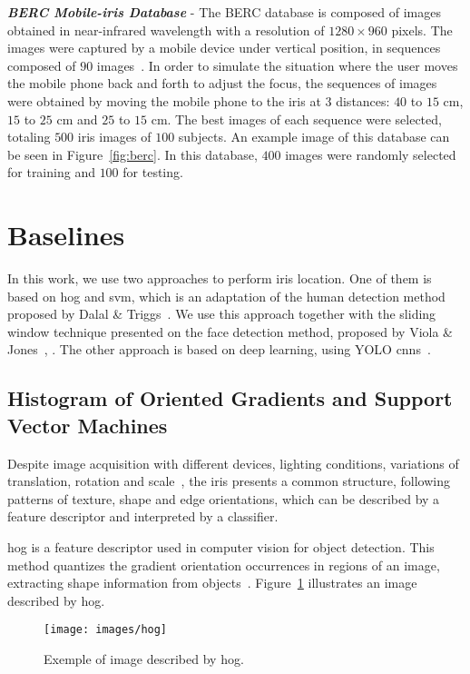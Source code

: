 \documentclass[conference]{IEEEtran}
\begin{document}
\textit{\textbf{BERC Mobile-iris Database}} - The BERC database is composed of images obtained in near-infrared wavelength with a resolution of $1280\times960$ pixels. 
The images were captured by a mobile device under vertical position, in sequences composed of $90$ images~\cite{kim2016empirical}.
In order to simulate the situation where the user moves the mobile phone back and forth to adjust the focus, the sequences of images were obtained by moving the mobile phone to the iris at $3$ distances: $40$ to $15$ cm, $15$ to $25$ cm and $25$ to $15$ cm.
The best images of each sequence were selected, totaling $500$ iris images of $100$ subjects.
An example image of this database can be seen in Figure~\ref{fig:berc}.
In this database, $400$ images were randomly selected for training and $100$ for testing.


\section{Baselines}
\label{sec:baselines}

In this work, we use two approaches to perform iris location. 
One of them is based on \gls*{hog} and \gls*{svm}, which is an adaptation of the human detection method proposed by Dalal \& Triggs~\cite{dalal2005histograms}. 
We use this approach together with the sliding window technique presented on the face detection method, proposed by Viola \& Jones~\cite{viola2001}, \cite{viola2004}.
The other approach is based on deep learning, using YOLO \glspl*{cnn}~\cite{redmon:2016}.

\subsection{Histogram of Oriented Gradients and Support Vector Machines}
%
Despite image acquisition with different devices, lighting conditions, variations of translation, rotation and scale~\cite{zhu2000biometric}, the iris presents a common structure, following patterns of texture, shape and edge orientations, which can be described by a feature descriptor and interpreted by a classifier.

\gls*{hog} is a feature descriptor used in computer vision for object detection. This method quantizes the gradient orientation occurrences in regions of an image, extracting shape information from objects~\cite{dalal2005histograms}. 
Figure~\ref{fig:hog} illustrates an image described by \gls*{hog}.

\begin{figure}[!htb]
\centering
\texttt{[image: images/hog]}
\vspace{-6mm}
\caption{Exemple of image described by \gls*{hog}.}
\label{fig:hog}
\vspace{-2mm}
\end{figure}
\end{document}
